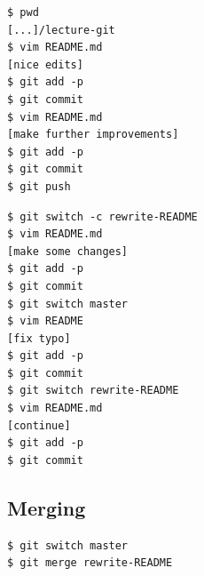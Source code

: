 \begin{frame}[fragile]
  \begin{example}[Linear]
    \begin{lstlisting}
$ pwd
[...]/lecture-git
$ vim README.md
[nice edits]
$ git add -p
$ git commit
$ vim README.md
[make further improvements]
$ git add -p
$ git commit
$ git push
    \end{lstlisting}
  \end{example}
\end{frame}

\begin{frame}[fragile]
  \begin{example}
    \begin{lstlisting}
$ git switch -c rewrite-README
$ vim README.md
[make some changes]
$ git add -p
$ git commit
$ git switch master
$ vim README
[fix typo]
$ git add -p
$ git commit
$ git switch rewrite-README
$ vim README.md
[continue]
$ git add -p
$ git commit
    \end{lstlisting}
  \end{example}
\end{frame}

\subsection{Merging}

\begin{frame}[fragile]
  \begin{example}[Merging]
    \begin{lstlisting}
$ git switch master
$ git merge rewrite-README
    \end{lstlisting}
  \end{example}
\end{frame}

